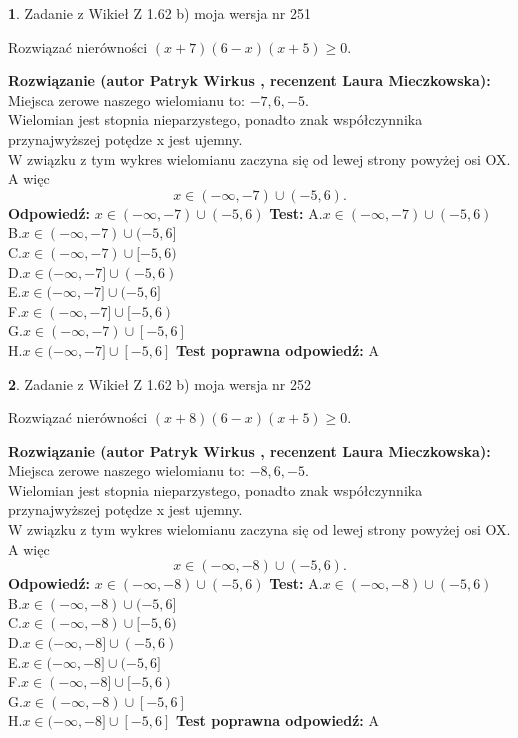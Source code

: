 \documentclass[12pt, a4paper]{article}
\theoremstyle{definition} %
\newtheorem{zad}{}
\newcommand{\zadStart}[1]{\begin{zad}#1\newline}
\newcommand{\zadStop}{\end{zad}}
\newcommand{\rozwStart}[2]{\noindent \textbf{Rozwiązanie (autor #1 , recenzent #2): }\newline}
\newcommand{\rozwStop}{\newline}
\newcommand{\odpStart}{\noindent \textbf{Odpowiedź:}\newline}
\newcommand{\odpStop}{\newline}
\newcommand{\testStart}{\noindent \textbf{Test:}\newline}
\newcommand{\testStop}{\newline}
\newcommand{\kluczStart}{\noindent \textbf{Test poprawna odpowiedź:}\newline}
\newcommand{\kluczStop}{\newline}
\begin{document}
\zadStart{Zadanie z Wikieł Z 1.62 b) moja wersja nr 251}

Rozwiązać nierówności $(x+7)(6-x)(x+5)\ge0$.
\zadStop
\rozwStart{Patryk Wirkus}{Laura Mieczkowska}
Miejsca zerowe naszego wielomianu to: $-7, 6, -5$.\\
Wielomian jest stopnia nieparzystego, ponadto znak współczynnika przy\linebreak najwyższej potędze x jest ujemny.\\ W związku z tym wykres wielomianu zaczyna się od lewej strony powyżej osi OX. A więc $$x \in (-\infty,-7) \cup (-5,6).$$
\rozwStop
\odpStart
$x \in (-\infty,-7) \cup (-5,6)$
\odpStop
\testStart
A.$x \in (-\infty,-7) \cup (-5,6)$\\
B.$x \in (-\infty,-7) \cup (-5,6]$\\
C.$x \in (-\infty,-7) \cup [-5,6)$\\
D.$x \in (-\infty,-7] \cup (-5,6)$\\
E.$x \in (-\infty,-7] \cup (-5,6]$\\
F.$x \in (-\infty,-7] \cup [-5,6)$\\
G.$x \in (-\infty,-7) \cup [-5,6]$\\
H.$x \in (-\infty,-7] \cup [-5,6]$
\testStop
\kluczStart
A
\kluczStop



\zadStart{Zadanie z Wikieł Z 1.62 b) moja wersja nr 252}

Rozwiązać nierówności $(x+8)(6-x)(x+5)\ge0$.
\zadStop
\rozwStart{Patryk Wirkus}{Laura Mieczkowska}
Miejsca zerowe naszego wielomianu to: $-8, 6, -5$.\\
Wielomian jest stopnia nieparzystego, ponadto znak współczynnika przy\linebreak najwyższej potędze x jest ujemny.\\ W związku z tym wykres wielomianu zaczyna się od lewej strony powyżej osi OX. A więc $$x \in (-\infty,-8) \cup (-5,6).$$
\rozwStop
\odpStart
$x \in (-\infty,-8) \cup (-5,6)$
\odpStop
\testStart
A.$x \in (-\infty,-8) \cup (-5,6)$\\
B.$x \in (-\infty,-8) \cup (-5,6]$\\
C.$x \in (-\infty,-8) \cup [-5,6)$\\
D.$x \in (-\infty,-8] \cup (-5,6)$\\
E.$x \in (-\infty,-8] \cup (-5,6]$\\
F.$x \in (-\infty,-8] \cup [-5,6)$\\
G.$x \in (-\infty,-8) \cup [-5,6]$\\
H.$x \in (-\infty,-8] \cup [-5,6]$
\testStop
\kluczStart
A
\kluczStop
\end{document}
